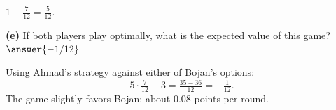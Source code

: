 \documentclass[12pt]{ximera}
\begin{document}
\begin{problem}
\begin{prompt}
\begin{feedback}
$1-\frac7{12}=\frac5{12}$.
\end{feedback}
\end{prompt}

\begin{prompt}
\textbf{(e)} If both players play optimally, what is the expected value of this game?
$\answer{-1/12}$

\begin{feedback}
Using Ahmad's strategy against either of Bojan's options:
\[
5\cdot\tfrac7{12}-3=\tfrac{35-36}{12}=-\tfrac1{12}.
\]
The game slightly favors Bojan: about $0.08$ points per round.
\end{feedback}
\end{prompt}
\end{problem}
\end{document}
